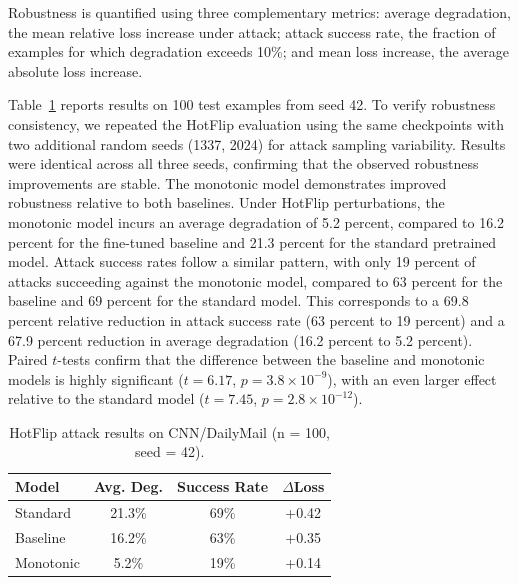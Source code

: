 \documentclass{article}
\theoremstyle{plain}
\theoremstyle{definition}
\theoremstyle{remark}
\begin{document}
Robustness is quantified using three complementary metrics: average degradation, the mean relative loss increase under attack; attack success rate, the fraction of examples for which degradation exceeds 10\%; and mean loss increase, the average absolute loss increase.


Table~\ref{tab:hotflip} reports results on 100 test examples from seed 42. To verify robustness consistency, we repeated the HotFlip evaluation using the same checkpoints with two additional random seeds (1337, 2024) for attack sampling variability. Results were identical across all three seeds, confirming that the observed robustness improvements are stable. The monotonic model demonstrates improved robustness relative to both baselines. Under HotFlip perturbations, the monotonic model incurs an average degradation of 5.2 percent, compared to 16.2 percent for the fine-tuned baseline and 21.3 percent for the standard pretrained model. Attack success rates follow a similar pattern, with only 19 percent of attacks succeeding against the monotonic model, compared to 63 percent for the baseline and 69 percent for the standard model. This corresponds to a 69.8 percent relative reduction in attack success rate (63 percent to 19 percent) and a 67.9 percent reduction in average degradation (16.2 percent to 5.2 percent). Paired $t$-tests confirm that the difference between the baseline and monotonic models is highly significant ($t {= }6.17$, $p = 3.8 {\times} 10^{-9}$), with an even larger effect relative to the standard model ($t {=} 7.45$, $p {=} 2.8{ \times} 10^{-12}$).



\begin{table}[t]
\caption{HotFlip attack results on CNN/DailyMail (n = 100, seed = 42).}
\label{tab:hotflip}
\vskip 0.1in
\begin{center}
\begin{small}
\begin{tabular}{lccc}
\toprule
Model & Avg. Deg. & Success Rate & $\Delta$Loss \\
\midrule
Standard  & 21.3\% & 69\% & +0.42 \\
Baseline  & 16.2\% & 63\% & +0.35 \\
Monotonic &  5.2\% & 19\% & +0.14 \\
\bottomrule
\end{tabular}
\end{small}
\end{center}
\vskip -0.1in
\end{table}
\end{document}
